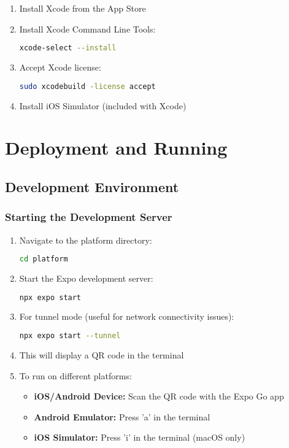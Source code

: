 \documentclass[11pt,a4paper]{article}
\begin{document}
\begin{enumerate}
    \item Install Xcode from the App Store
    \item Install Xcode Command Line Tools:
    \begin{lstlisting}[language=bash]
xcode-select --install
    \end{lstlisting}
    
    \item Accept Xcode license:
    \begin{lstlisting}[language=bash]
sudo xcodebuild -license accept
    \end{lstlisting}
    
    \item Install iOS Simulator (included with Xcode)
\end{enumerate}

\section{Deployment and Running}

\subsection{Development Environment}

\subsubsection{Starting the Development Server}

\begin{enumerate}
    \item Navigate to the platform directory:
    \begin{lstlisting}[language=bash]
cd platform
    \end{lstlisting}
    
    \item Start the Expo development server:
    \begin{lstlisting}[language=bash]
npx expo start
    \end{lstlisting}
    
    \item For tunnel mode (useful for network connectivity issues):
    \begin{lstlisting}[language=bash]
npx expo start --tunnel
    \end{lstlisting}
    
    \item This will display a QR code in the terminal
    \item To run on different platforms:
    \begin{itemize}
        \item \textbf{iOS/Android Device:} Scan the QR code with the Expo Go app
        \item \textbf{Android Emulator:} Press 'a' in the terminal
        \item \textbf{iOS Simulator:} Press 'i' in the terminal (macOS only)
    \end{itemize}
\end{enumerate}
\end{document}
